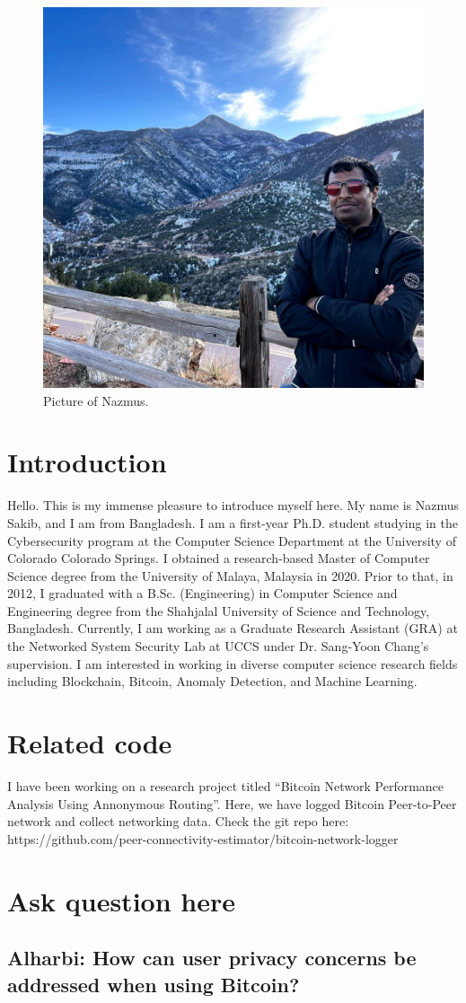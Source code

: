 

\begin{figure}[h!]
\centering
\includegraphics[width=.5\columnwidth]{picture-nazmus.jpg}
\caption{Picture of Nazmus.}
\label{fig:my-picture}
\end{figure}

\section{Introduction}

Hello. This is my immense pleasure to introduce myself here. My name is Nazmus Sakib, and I am from Bangladesh. I am a first-year Ph.D. student studying in the Cybersecurity program at the Computer Science Department at the University of Colorado Colorado Springs. I obtained a research-based Master of Computer Science degree from the University of Malaya, Malaysia in 2020. Prior to that, in 2012, I graduated with a B.Sc. (Engineering) in Computer Science and Engineering degree from the Shahjalal University of Science and Technology, Bangladesh. Currently, I am working as a Graduate Research Assistant (GRA) at the Networked System Security Lab at UCCS under Dr. Sang-Yoon Chang's supervision. I am interested in working in diverse computer science research fields including Blockchain, Bitcoin, Anomaly Detection, and Machine Learning.

\section{Related code}

I have been working on a research project titled ``Bitcoin Network Performance Analysis Using Annonymous Routing''. Here, we have logged Bitcoin Peer-to-Peer network and collect networking data.
Check the git repo here: https://github.com/peer-connectivity-estimator/bitcoin-network-logger

\section{Ask question here}

\subsection{Alharbi: How can user privacy concerns be addressed when using Bitcoin?}